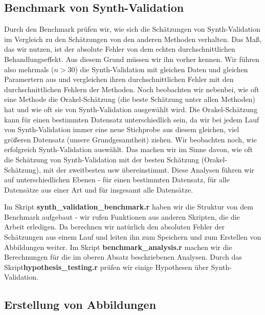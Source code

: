 \documentclass[12pt,a4paper,twoside]{scrartcl}
\numberwithin{equation}{section}
\begin{document}
  	\subsection{Benchmark von Synth-Validation}\label{subsec:benchmarkSynthValidation}
Durch den Benchmark prüfen wir, wie sich die Schätzungen von Synth-Validation im Vergleich zu den Schätzungen von den anderen Methoden verhalten. Das Maß, das wir nutzen, ist der absolute Fehler von dem echten durchschnittlichen Behandlungseffekt. Aus diesem Grund müssen wir ihn vorher kennen. Wir führen also mehrmals ($n>30$) die Synth-Validation mit gleichen Daten und gleichen Paramertern aus und vergleichen ihren durchschnittlichen Fehler mit den durchschnittlichen Fehlern der Methoden. Noch beobachten wir nebenbei, wie oft eine Methode die Orakel-Schätzung (die beste Schätzung unter allen Methoden) hat und wie oft sie von Synth-Validation ausgewählt wird. Die Orakel-Schätzung kann für einen bestimmten Datensatz unterschiedlich sein, da wir bei jedem Lauf von Synth-Validation immer eine neue Stichprobe aus diesem gleichen, viel größeren Datensatz (unsere Grundgesamtheit) ziehen. Wir beobachten noch, wie erfolgreich Synth-Validation auswählt. Das machen wir im Sinne davon, wie oft die Schätzung von Synth-Validation mit der besten Schätzung (Orakel-Schätzung), mit der zweitbesten usw übereinstimmt. Diese Analysen führen wir auf unterschiedlichen Ebenen - für einen bestimmten Datensatz, für alle Datensätze aus einer Art und für insgesamt alle Datensätze.\par 

\noindent
Im Skript \textbf{synth\_validation\_benchmark.r} haben wir die Struktur von dem Benchmark aufgebaut - wir rufen Funktionen aus anderen Skripten, die die Arbeit erledigen. Da berechnen wir natürlich den absoluten Fehler der Schätzungen aus einem Lauf und leiten ihn zum Speichern und zum Erstellen von Abbildungen weiter. Im Skript \textbf{benchmark\_analysis.r} machen wir die Berechnungen für die im oberen Absatz beschriebenen Analysen. Durch das Skript\textbf{hypothesis\_testing.r} prüfen wir einige Hypothesen über Synth-Validation. \par 

\subsection{Erstellung von Abbildungen}\label{subsec:erstellungAbbildungen}
\end{document}
